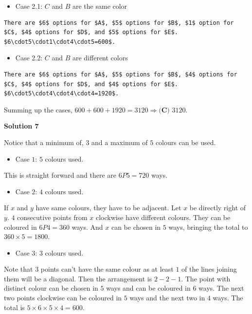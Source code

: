 \begin{enumerate}
            \begin{itemize}
        \item Case 2.1: $C$ and $B$ are the same color
            \end{itemize}
            \begin{verbatim}
There are $6$ options for $A$, $5$ options for $B$, $1$ option for $C$, $4$ options for $D$, and $5$ options for $E$. $6\cdot5\cdot1\cdot4\cdot5=600$.
\end{verbatim}


            \begin{itemize}
        \item Case 2.2: $C$ and $B$ are different colors
            \end{itemize}
            \begin{verbatim}
There are $6$ options for $A$, $5$ options for $B$, $4$ options for $C$, $4$ options for $D$, and $4$ options for $E$. $6\cdot5\cdot4\cdot4\cdot4=1920$.
\end{verbatim}

Summing up the cases, $600+600+1920=3120 \Longrightarrow \boxed{\textbf{(C) } 3120}$.

 



\textbf{Solution 7}

Notice that a minimum of, $3$ and a maximum of $5$ colours can be used.

 
            \begin{itemize}
        \item Case $1$: $5$ colours used.
            \end{itemize}
            This is straight forward and there are $6P5 = 720$ ways.

 
            \begin{itemize}
        \item Case $2$: $4$ colours used.
            \end{itemize}
            If $x$ and $y$ have same colours, they have to be adjacent. Let $x$ be directly right of $y$. $4$ consecutive points from $x$ clockwise have different colours. They can be coloured in $6P4=360$ ways. And $x$ can be chosen in $5$ ways, bringing the total to $360 \times 5=1800$.

 
            \begin{itemize}
        \item Case $3$: $3$ colours used.
            \end{itemize}
            Note that $3$ points can't have the same colour as at least $1$ of the lines joining them will be a diagonal. Then the arrangement is $2-2-1$. The point with distinct colour can be chosen in $5$ ways and can be coloured in $6$ ways. The next two points clockwise can be coloured in $5$ ways and the next two in $4$ ways. The total is $5 \times 6 \times 5 \times 4=600$.


\end{enumerate}

